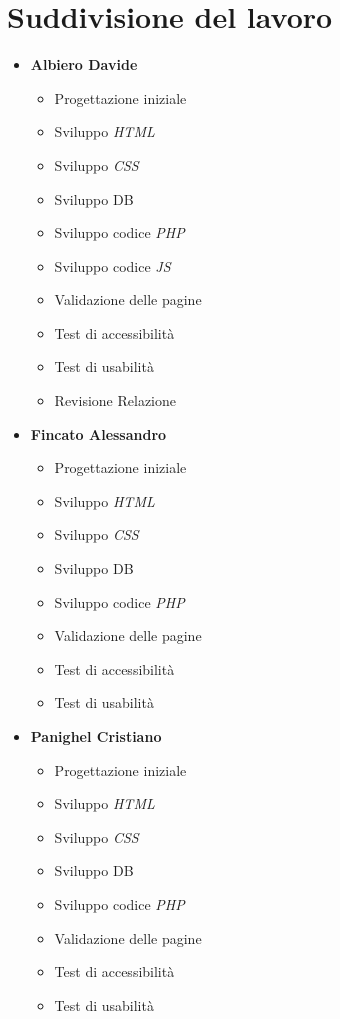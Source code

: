 \section{Suddivisione del lavoro}
\begin{itemize}
	\item \textbf{Albiero Davide}
	\begin{itemize}
		\item Progettazione iniziale
		\item Sviluppo \emph{HTML}
		\item Sviluppo \emph{CSS}
		\item Sviluppo DB
		\item Sviluppo codice \emph{PHP}
		\item Sviluppo codice \emph{JS}
		\item Validazione delle pagine
		\item Test di accessibilità
		\item Test di usabilità
		\item Revisione Relazione
	\end{itemize}
	\item \textbf{Fincato Alessandro}
	\begin{itemize}
		\item Progettazione iniziale
		\item Sviluppo \emph{HTML}
		\item Sviluppo \emph{CSS}
		\item Sviluppo DB
		\item Sviluppo codice \emph{PHP}
		\item Validazione delle pagine
		\item Test di accessibilità
		\item Test di usabilità
	\end{itemize}
	\item \textbf{Panighel Cristiano}
	\begin{itemize}
		\item Progettazione iniziale
		\item Sviluppo \emph{HTML}
		\item Sviluppo \emph{CSS}
		\item Sviluppo DB
		\item Sviluppo codice \emph{PHP}
		\item Validazione delle pagine
		\item Test di accessibilità
		\item Test di usabilità
	\end{itemize}

\end{itemize}
